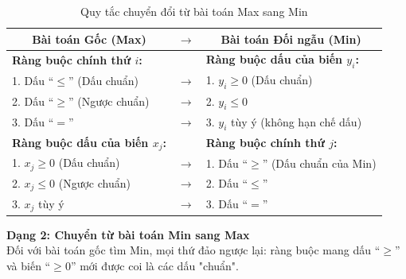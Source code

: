 \begin{table}[htbp]
    \centering
    \renewcommand{\arraystretch}{1.5}
    \begin{tabular}{|l|c|l|}
        \hline
        \multicolumn{1}{|c|}{\textbf{Bài toán Gốc (Max)}} & \textbf{$\rightarrow$} & \multicolumn{1}{c|}{\textbf{Bài toán Đối ngẫu (Min)}} \\
        \hline
        \textbf{Ràng buộc chính thứ $i$:} & & \textbf{Ràng buộc dấu của biến $y_i$:} \\
        1. Dấu ``$\le$'' (Dấu chuẩn) & $\rightarrow$ & 1. $y_i \ge 0$ (Dấu chuẩn) \\
        2. Dấu ``$\ge$'' (Ngược chuẩn) & $\rightarrow$ & 2. $y_i \le 0$ \\
        3. Dấu ``$=$'' & $\rightarrow$ & 3. $y_i$ tùy ý (không hạn chế dấu) \\
        \hline
        \textbf{Ràng buộc dấu của biến $x_j$:} & & \textbf{Ràng buộc chính thứ $j$:} \\
        1. $x_j \ge 0$ (Dấu chuẩn) & $\rightarrow$ & 1. Dấu ``$\ge$'' (Dấu chuẩn của Min) \\
        2. $x_j \le 0$ (Ngược chuẩn) & $\rightarrow$ & 2. Dấu ``$\le$'' \\
        3. $x_j$ tùy ý & $\rightarrow$ & 3. Dấu ``$=$'' \\
        \hline
    \end{tabular}
    \caption{Quy tắc chuyển đổi từ bài toán Max sang Min}
    \label{tab:doi_ngau_max_min}
\end{table}

\vspace{0.3cm}
\textbf{Dạng 2: Chuyển từ bài toán Min sang Max} \\
Đối với bài toán gốc tìm Min, mọi thứ đảo ngược lại: ràng buộc mang dấu ``$\ge$'' và biến ``$\ge 0$'' mới được coi là các dấu "chuẩn".


